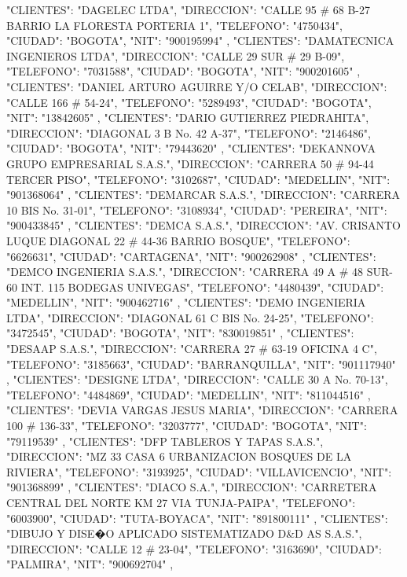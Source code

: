    {
   "CLIENTES": "DAGELEC LTDA",
   "DIRECCION": "CALLE 95 # 68 B-27 BARRIO LA FLORESTA PORTERIA 1",
   "TELEFONO": "4750434",
   "CIUDAD": "BOGOTA",
   "NIT": "900195994"
   },
   {
   "CLIENTES": "DAMATECNICA INGENIEROS LTDA",
   "DIRECCION": "CALLE 29 SUR # 29 B-09",
   "TELEFONO": "7031588",
   "CIUDAD": "BOGOTA",
   "NIT": "900201605"
   },
   {
   "CLIENTES": "DANIEL ARTURO AGUIRRE Y/O CELAB",
   "DIRECCION": "CALLE 166 # 54-24",
   "TELEFONO": "5289493",
   "CIUDAD": "BOGOTA",
   "NIT": "13842605"
   },
   {
   "CLIENTES": "DARIO GUTIERREZ PIEDRAHITA",
   "DIRECCION": "DIAGONAL 3 B No. 42 A-37",
   "TELEFONO": "2146486",
   "CIUDAD": "BOGOTA",
   "NIT": "79443620"
   },
   {
   "CLIENTES": "DEKANNOVA GRUPO EMPRESARIAL S.A.S.",
   "DIRECCION": "CARRERA 50 # 94-44 TERCER PISO",
   "TELEFONO": "3102687",
   "CIUDAD": "MEDELLIN",
   "NIT": "901368064"
   },
   {
   "CLIENTES": "DEMARCAR S.A.S.",
   "DIRECCION": "CARRERA 10 BIS No. 31-01",
   "TELEFONO": "3108934",
   "CIUDAD": "PEREIRA",
   "NIT": "900433845"
   },
   {
   "CLIENTES": "DEMCA S.A.S.",
   "DIRECCION": "AV. CRISANTO LUQUE DIAGONAL 22 # 44-36 BARRIO BOSQUE",
   "TELEFONO": "6626631",
   "CIUDAD": "CARTAGENA",
   "NIT": "900262908"
   },
   {
   "CLIENTES": "DEMCO INGENIERIA S.A.S.",
   "DIRECCION": "CARRERA 49 A # 48 SUR-60 INT. 115 BODEGAS UNIVEGAS",
   "TELEFONO": "4480439",
   "CIUDAD": "MEDELLIN",
   "NIT": "900462716"
   },
   {
   "CLIENTES": "DEMO INGENIERIA LTDA",
   "DIRECCION": "DIAGONAL 61 C BIS No. 24-25",
   "TELEFONO": "3472545",
   "CIUDAD": "BOGOTA",
   "NIT": "830019851"
   },
   {
   "CLIENTES": "DESAAP S.A.S.",
   "DIRECCION": "CARRERA 27 # 63-19 OFICINA 4 C",
   "TELEFONO": "3185663",
   "CIUDAD": "BARRANQUILLA",
   "NIT": "901117940"
   },
   {
   "CLIENTES": "DESIGNE LTDA",
   "DIRECCION": "CALLE 30 A No. 70-13",
   "TELEFONO": "4484869",
   "CIUDAD": "MEDELLIN",
   "NIT": "811044516"
   },
   {
   "CLIENTES": "DEVIA VARGAS JESUS MARIA",
   "DIRECCION": "CARRERA 100 # 136-33",
   "TELEFONO": "3203777",
   "CIUDAD": "BOGOTA",
   "NIT": "79119539"
   },
   {
   "CLIENTES": "DFP TABLEROS Y TAPAS S.A.S.",
   "DIRECCION": "MZ 33 CASA 6 URBANIZACION BOSQUES DE LA RIVIERA",
   "TELEFONO": "3193925",
   "CIUDAD": "VILLAVICENCIO",
   "NIT": "901368899"
   },
   {
   "CLIENTES": "DIACO S.A.",
   "DIRECCION": "CARRETERA CENTRAL DEL NORTE KM 27 VIA TUNJA-PAIPA",
   "TELEFONO": "6003900",
   "CIUDAD": "TUTA-BOYACA",
   "NIT": "891800111"
   },
   {
   "CLIENTES": "DIBUJO Y DISE�O APLICADO SISTEMATIZADO D&D AS S.A.S.",
   "DIRECCION": "CALLE 12 # 23-04",
   "TELEFONO": "3163690",
   "CIUDAD": "PALMIRA",
   "NIT": "900692704"
   },
